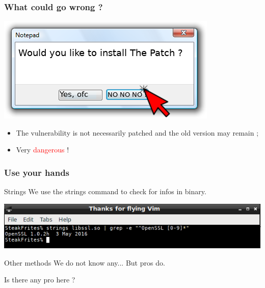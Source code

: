 \documentclass[11pt]{beamer}
\begin{document}
\begin{frame}
    \frametitle{What could go wrong ?}
    \begin{center}
    \includegraphics[scale=0.5]{box.png}
    \end{center}

    \begin{block}{}
    \begin{itemize}
        \item The vulnerability is not necessarily patched and the old version may remain ;
        \item \Huge Very \textcolor{red}{dangerous} !
    \end{itemize}
    \end{block}

    \end{frame}

\begin{frame}
    \frametitle{Use your hands} 
    \begin{block}{Strings}
        We use the strings command to check for infos in binary.
    \end{block}
    \includegraphics[scale=0.5]{strings.png}
    \begin{block}{Other methods}
       We do not know any... But pros do.
    \end{block}
    Is there any pro here ? 
\end{frame}
\end{document}
